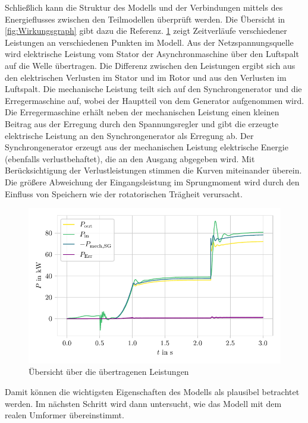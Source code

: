 Schließlich kann die Struktur des Modells und der Verbindungen mittels des Energie\-flusses zwischen den Teilmodellen überprüft werden. Die Übersicht in \cref{fig:Wirkungsgraph} gibt dazu die Referenz. \cref{fig:VerifikationLeistungen} zeigt Zeitverläufe verschiedener Leistungen an verschiedenen Punkten im Modell. Aus der Netzspannungsquelle wird elektrische Leistung vom Stator der Asynchronmaschine über den Luftspalt auf die Welle übertragen. Die Differenz zwischen den Leistungen ergibt sich aus den elektrischen Verlusten im Stator und im Rotor und aus den Verlusten im Luftspalt. Die mechanische Leistung teilt sich auf den Synchrongenerator und die Erregermaschine auf, wobei der Hauptteil von dem Generator aufgenommen wird. Die Erregermaschine erhält neben der mechanischen Leistung einen kleinen Beitrag aus der Erregung durch den Spannungsregler und gibt die erzeugte elektrische Leistung an den Synchrongenerator als Erregung ab. Der Synchrongenerator erzeugt aus der mechanischen Leistung elektrische Energie (ebenfalls verlustbehaftet), die an den Ausgang abgegeben wird. Mit Berücksichtigung der Verlustleistungen stimmen die Kurven miteinander überein. Die größere Abweichung der Eingangsleistung im Sprungmoment wird durch den Einfluss von Speichern wie der rotatorischen Trägheit verursacht.
\begin{figure}
    \centering
    \includegraphics{Bilder/Verifikation_Leistung.pdf}
    \caption{Übersicht über die übertragenen Leistungen}
    \label{fig:VerifikationLeistungen}
\end{figure}

Damit können die wichtigsten Eigenschaften des Modells als plausibel betrachtet werden. Im nächsten Schritt wird dann untersucht, wie das Modell mit dem realen Umformer übereinstimmt.

